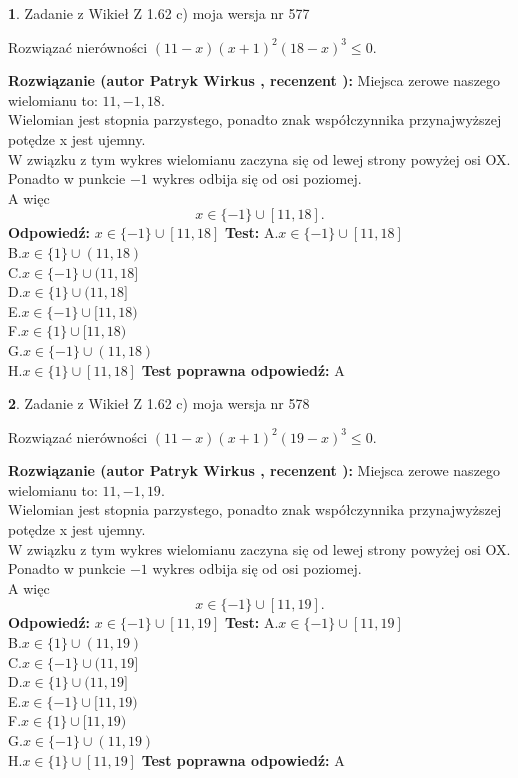 \documentclass[12pt, a4paper]{article}
\theoremstyle{definition} %
\newtheorem{zad}{}
\newcommand{\zadStart}[1]{\begin{zad}#1\newline}
\newcommand{\zadStop}{\end{zad}}
\newcommand{\rozwStart}[2]{\noindent \textbf{Rozwiązanie (autor #1 , recenzent #2): }\newline}
\newcommand{\rozwStop}{\newline}
\newcommand{\odpStart}{\noindent \textbf{Odpowiedź:}\newline}
\newcommand{\odpStop}{\newline}
\newcommand{\testStart}{\noindent \textbf{Test:}\newline}
\newcommand{\testStop}{\newline}
\newcommand{\kluczStart}{\noindent \textbf{Test poprawna odpowiedź:}\newline}
\newcommand{\kluczStop}{\newline}
\begin{document}
\zadStart{Zadanie z Wikieł Z 1.62 c) moja wersja nr 577}

Rozwiązać nierówności $(11-x)(x+1)^{2}(18-x)^{3}\le0$.
\zadStop
\rozwStart{Patryk Wirkus}{}
Miejsca zerowe naszego wielomianu to: $11, -1, 18$.\\
Wielomian jest stopnia parzystego, ponadto znak współczynnika przy\linebreak najwyższej potędze x jest ujemny.\\ W związku z tym wykres wielomianu zaczyna się od lewej strony powyżej osi OX.\\
Ponadto w punkcie $-1$ wykres odbija się od osi poziomej.\\
A więc $$x \in \{-1\} \cup [11,18].$$
\rozwStop
\odpStart
$x \in \{-1\} \cup [11,18]$
\odpStop
\testStart
A.$x \in \{-1\} \cup [11,18]$\\
B.$x \in \{1\} \cup (11,18)$\\
C.$x \in \{-1\} \cup (11,18]$\\
D.$x \in \{1\} \cup (11,18]$\\
E.$x \in \{-1\} \cup [11,18)$\\
F.$x \in \{1\} \cup [11,18)$\\
G.$x \in \{-1\} \cup (11,18)$\\
H.$x \in \{1\} \cup [11,18]$
\testStop
\kluczStart
A
\kluczStop



\zadStart{Zadanie z Wikieł Z 1.62 c) moja wersja nr 578}

Rozwiązać nierówności $(11-x)(x+1)^{2}(19-x)^{3}\le0$.
\zadStop
\rozwStart{Patryk Wirkus}{}
Miejsca zerowe naszego wielomianu to: $11, -1, 19$.\\
Wielomian jest stopnia parzystego, ponadto znak współczynnika przy\linebreak najwyższej potędze x jest ujemny.\\ W związku z tym wykres wielomianu zaczyna się od lewej strony powyżej osi OX.\\
Ponadto w punkcie $-1$ wykres odbija się od osi poziomej.\\
A więc $$x \in \{-1\} \cup [11,19].$$
\rozwStop
\odpStart
$x \in \{-1\} \cup [11,19]$
\odpStop
\testStart
A.$x \in \{-1\} \cup [11,19]$\\
B.$x \in \{1\} \cup (11,19)$\\
C.$x \in \{-1\} \cup (11,19]$\\
D.$x \in \{1\} \cup (11,19]$\\
E.$x \in \{-1\} \cup [11,19)$\\
F.$x \in \{1\} \cup [11,19)$\\
G.$x \in \{-1\} \cup (11,19)$\\
H.$x \in \{1\} \cup [11,19]$
\testStop
\kluczStart
A
\kluczStop
\end{document}
